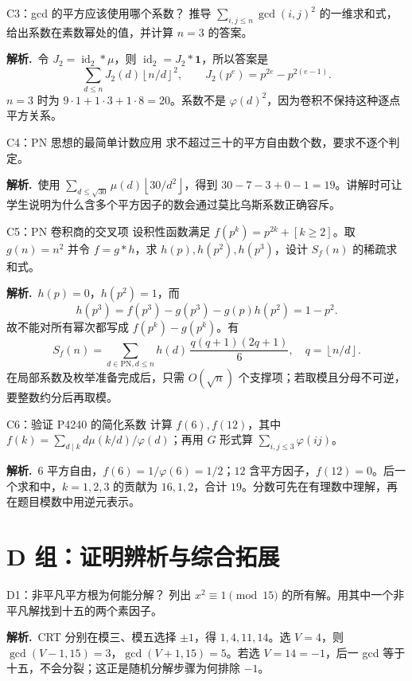 \documentclass[UTF8,a4paper,11pt,twoside,openright,fontset=fandol]{ctexbook}
\theoremstyle{definition}
\newcommand{\one}{\mathbf 1}
\newcommand{\id}{\operatorname{id}}
\newcommand{\floor}[1]{\left\lfloor #1\right\rfloor}
\newcommand{\sol}{\par\noindent\textbf{解析.}\ }
\begin{document}
\begin{problem}{C3：gcd 的平方应该使用哪个系数？}
推导 $\sum_{i,j\le n}\gcd(i,j)^2$ 的一维求和式，给出系数在素数幂处的值，并计算 $n=3$ 的答案。
\end{problem}

\sol 令 $J_2=\id_2*\mu$，则 $\id_2=J_2*\one$，所以答案是
\[
 \sum_{d\le n}J_2(d)\floor{n/d}^2,\qquad
 J_2(p^e)=p^{2e}-p^{2(e-1)}.
\]
$n=3$ 时为 $9\cdot1+1\cdot3+1\cdot8=20$。系数不是 $\varphi(d)^2$，因为卷积不保持这种逐点平方关系。


\begin{problem}{C4：PN 思想的最简单计数应用}
求不超过三十的平方自由数个数，要求不逐个判定。
\end{problem}

\sol 使用 $\sum_{d\le\sqrt{30}}\mu(d)\floor{30/d^2}$，得到 $30-7-3+0-1=19$。讲解时可让学生说明为什么含多个平方因子的数会通过莫比乌斯系数正确容斥。


\begin{problem}{C5：PN 卷积商的交叉项}
设积性函数满足 $f(p^k)=p^{2k}+[k\ge2]$。取 $g(n)=n^2$ 并令 $f=g*h$，求 $h(p),h(p^2),h(p^3)$，设计 $S_f(n)$ 的稀疏求和式。
\end{problem}

\sol $h(p)=0$，$h(p^2)=1$，而
\[
 h(p^3)=f(p^3)-g(p^3)-g(p)h(p^2)=1-p^2.
\]
故不能对所有幂次都写成 $f(p^k)-g(p^k)$。有
\[
 S_f(n)=\sum_{d\in\mathrm{PN},d\le n}h(d)\,
 \frac{q(q+1)(2q+1)}6,\quad q=\floor{n/d}.
\]
在局部系数及枚举准备完成后，只需 $O(\sqrt n)$ 个支撑项；若取模且分母不可逆，要整数约分后再取模。


\begin{problem}{C6：验证 P4240 的简化系数}
计算 $f(6),f(12)$，其中 $f(k)=\sum_{d\mid k}d\mu(k/d)/\varphi(d)$；再用 $G$ 形式算 $\sum_{i,j\le3}\varphi(ij)$。
\end{problem}

\sol $6$ 平方自由，$f(6)=1/\varphi(6)=1/2$；$12$ 含平方因子，$f(12)=0$。后一个求和中，$k=1,2,3$ 的贡献为 $16,1,2$，合计 $19$。分数可先在有理数中理解，再在题目模数中用逆元表示。


\section{D 组：证明辨析与综合拓展}
\begin{problem}{D1：非平凡平方根为何能分解？}
列出 $x^2\equiv1\pmod{15}$ 的所有解。用其中一个非平凡解找到十五的两个素因子。
\end{problem}

\sol CRT 分别在模三、模五选择 $\pm1$，得 $1,4,11,14$。选 $V=4$，则 $\gcd(V-1,15)=3$，$\gcd(V+1,15)=5$。若选 $V=14=-1$，后一 gcd 等于十五，不会分裂；这正是随机分解步骤为何排除 $-1$。
\end{document}
